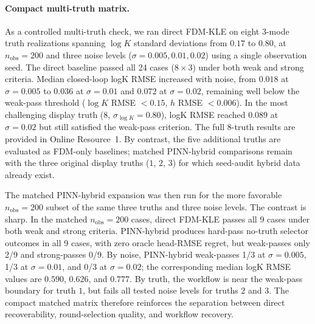 \documentclass[pdflatex,sn-mathphys,Numbered,iicol]{sn-jnl}
\newcommand{\nobs}{n_{\mathrm{obs}}}
\begin{document}
\paragraph{Compact multi-truth matrix.}
As a controlled multi-truth check, we ran direct FDM-KLE on eight
3-mode truth realizations spanning $\log K$ standard deviations from $0.17$ to
$0.80$, at $\nobs=200$ and three noise levels ($\sigma=0.005,0.01,0.02$) using
a single observation seed. The direct baseline passed all 24 cases ($8 \times 3$)
under both weak and strong criteria. Median closed-loop logK RMSE increased with
noise, from $0.018$ at $\sigma=0.005$ to $0.036$ at $\sigma=0.01$ and $0.072$
at $\sigma=0.02$, remaining well below the weak-pass threshold ($\log K$ RMSE $<0.15$, $h$ RMSE $<0.006$). In the
most challenging display truth ($8$, $\sigma_{\log K}=0.80$), logK RMSE reached
$0.089$ at $\sigma=0.02$ but still satisfied the weak-pass criterion. The full
8-truth results are provided in Online Resource~1. By
contrast, the five additional truths are evaluated as FDM-only baselines;
matched PINN-hybrid comparisons remain with the three original display truths
($1$, $2$, $3$) for which seed-audit hybrid data already exist.

The matched PINN-hybrid expansion was then run for the more favorable
$\nobs=200$ subset of the same three truths and three noise levels. The
contrast is sharp. In the matched $\nobs=200$ cases, direct FDM-KLE passes
all 9 cases under both weak and strong criteria. PINN-hybrid produces hard-pass
no-truth selector outcomes in all 9 cases, with zero oracle head-RMSE regret,
but weak-passes only 2/9 and strong-passes 0/9. By noise, PINN-hybrid
weak-passes 1/3 at $\sigma=0.005$, 1/3 at $\sigma=0.01$, and 0/3 at
$\sigma=0.02$; the corresponding median logK RMSE values are $0.590$,
$0.626$, and $0.777$. By truth, the workflow is near the weak-pass boundary
for truth $1$, but fails all tested noise levels for truths $2$ and $3$.
The compact matched matrix therefore reinforces the separation between direct
recoverability, round-selection quality, and workflow recovery.
\end{document}
